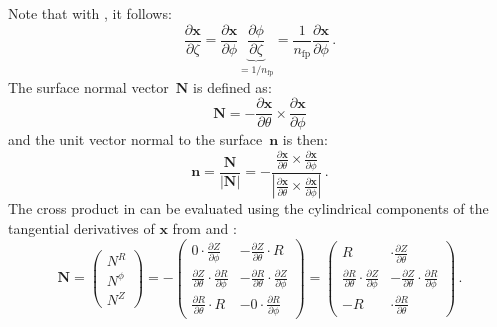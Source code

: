 Note that with , it follows:
\begin{equation}
    \frac{\partial \mathbf{x}}{\partial \zeta}
  = \frac{\partial \mathbf{x}}{\partial \phi } \underbrace{\frac{\partial \phi}{\partial \zeta}}_{=1/n_\mathrm{fp}}
  = \frac{1}{n_\mathrm{fp}} \frac{\partial \mathbf{x}}{\partial \phi} \label{eqn:dXdz} \, .
\end{equation}
The surface normal vector~$\mathbf{N}$ is defined as:
\begin{equation}
  \mathbf{N} = - \frac{\partial \mathbf{x}}{\partial \theta} \times \frac{\partial \mathbf{x}}{\partial \phi} \label{eqn:surfN}
\end{equation}
and the unit vector normal to the surface~$\mathbf{n}$ is then:
\begin{equation}
    \mathbf{n}
  = \frac{\mathbf{N}}{|\mathbf{N}|}
  = - \frac{       \frac{\partial \mathbf{x}}{\partial \theta} \times \frac{\partial \mathbf{x}}{\partial \phi}        }
           {\left| \frac{\partial \mathbf{x}}{\partial \theta} \times \frac{\partial \mathbf{x}}{\partial \phi} \right|} \, .
\end{equation}
The cross product in  can be evaluated using the cylindrical components of
the tangential derivatives of $\mathbf{x}$ from  and :
\begin{equation}
 \mathbf{N} = \left( \begin{aligned} N^R \\ N^\phi \\ N^Z \end{aligned} \right)
            = - \left( \begin{aligned}
                                   0                 \cdot \frac{\partial Z}{\partial \phi  } &- \frac{\partial Z}{\partial \theta} \cdot                  R               \\
                  \frac{\partial Z}{\partial \theta} \cdot \frac{\partial R}{\partial \phi  } &- \frac{\partial R}{\partial \theta} \cdot \frac{\partial Z}{\partial \phi} \\
                  \frac{\partial R}{\partial \theta} \cdot                  R                 &-                  0                 \cdot \frac{\partial R}{\partial \phi}
                \end{aligned} \right)
            =   \left( \begin{aligned}
                                                       R                                      &\cdot                 \frac{\partial Z}{\partial \theta}                    \\
                  \frac{\partial R}{\partial \theta} \cdot \frac{\partial Z}{\partial \phi  } &-     \frac{\partial Z}{\partial \theta} \cdot \frac{\partial R}{\partial \phi} \\
                                                      -R                                      &\cdot                 \frac{\partial R}{\partial \theta}
                \end{aligned} \right) \label{eqn:surfNComponents} \, .
\end{equation}
